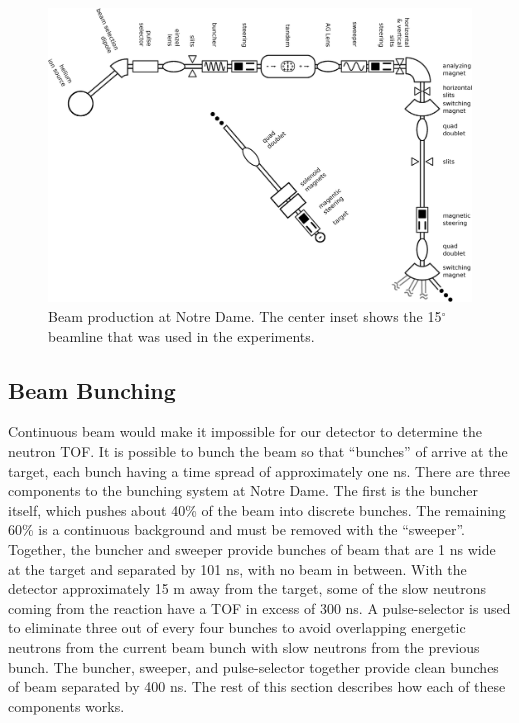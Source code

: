 \begin{figure}[htp]
\centering
\includegraphics[width=1.0\textwidth]{figures/NSL_beamline.eps}
\caption[Beam production at Notre Dame.]{Beam production at Notre Dame.  The center inset shows the 15$^{\circ}$ beamline that was used in the experiments.}
\label{fig:beamline}
\end{figure}

\subsection{Beam Bunching}

Continuous beam would make it impossible for our detector to determine the neutron TOF.  It is possible to bunch the beam so that ``bunches'' of  arrive at the target, each bunch having a time spread of approximately one ns. There are three components to the bunching system at Notre Dame.  The first is the buncher itself, which pushes about 40\% of the beam into discrete bunches.  The remaining 60\% is a continuous background and must be removed with the ``sweeper''.  Together, the buncher and sweeper provide bunches of beam that are 1 ns wide at the target and separated by 101 ns, with no beam in between.  With the detector approximately 15 m away from the target, some of the slow neutrons coming from the reaction have a TOF in excess of 300 ns.  A pulse-selector is used to eliminate three out of every four bunches to avoid overlapping energetic neutrons from the current beam bunch with slow neutrons from the previous bunch.  The buncher, sweeper, and pulse-selector together provide clean bunches of beam separated by 400 ns.  The rest of this section describes how each of these components works.

